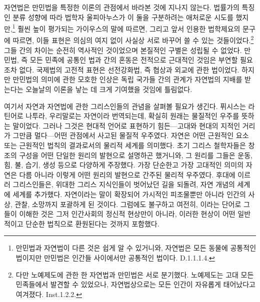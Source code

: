 자연법은 만민법을 특정한 이론의 관점에서 바라본 것에
지나지 않는다.
법률가의 특징인 분류 성향에 따라
법학자 울피아누스가
이 둘을 구분하려는 애처로운 시도를 했지만,\footnote{%
  만민법과 자연법이 다른 것은 쉽게 알 수 있거니와,
  자연법은 모든 동물에 공통적인 법이지만 만민법은 인간들 사이에서만
  공통적인 법이다. D.1.1.1.4.}
훨씬 높이 평가되는 가이우스의 말에 따르면, 그리고
앞서 인용한 법학제요의 문구에 따르면,
이들 표현은 의심의 여지 없이 사실상 서로 바꾸어 쓸 수 있는
것들이었다.\footnote{다만 노예제도에 관한 한 자연법과 만민법은
서로 분기했다. 노예제도는 고대 모든 민족들에서 발견할 수 있었으나,
자연법상으로는 모든 인간이 자유롭게 태어났다고 여겨졌다. Inst.1.2.2.}
그들 간의 차이는 순전히 역사적인 것이었으며
본질적인 구별은 성립될 수 없었다.
만민법, 즉 모든 민족에 공통인 법과
 간의 혼동은 전적으로 근대적인 것임은
부연할 필요조차 없다.
국제법의 고전적 표현은
선전강화법,
즉 협상과 외교에 관한 법이었다.
하지만 만민법의 의미에 관한 모호한 인상은
독립 국가들 간의 관계가 자연법의 지배를 받는다는 오늘날의 이론을
낳는 데 크게 기여했을 것임에 틀림없다.

여기서
자연과 자연법에 관한 그리스인들의 관념을 살펴볼 필요가 생긴다.
퓌시스는 라틴어로 나투라, 우리말로는
자연이라 번역되는데,
확실히 원래는 물질적인 우주를 뜻하는 말이었다.
그러나 그것은 현대적 언어로 표현하기 힘든---고대와 현대의 지적인 거리가
그만큼 멀다---어떤 관점에서 사고된
물질적 우주였다.
자연은 어떤 근원적인 요소 또는 근원적인 법칙의 결과로서의
물리적 세계를 의미했다.
초기 그리스 철학자들은
창조의 구성을 어떤 단일한 원리의 발현으로 설명하곤 했거니와,
그 원리를 그들은 운동, 힘, 불, 습기, 생성 등으로 다양하게 주장했다.
가장 단순한고 가장 고대적인 의미의 자연은 다름 아니라
이렇게 어떤 원리의 발현으로
간주된 물리적 우주였다.
후대에 이르러 그리스인들은, 위대한 그리스 지식인들이 벗어났던 길을 되돌려,
자연 개념의  세계에  세계를 추가했다.
자연이라는 말이 확장되어 가시적인 피조물뿐만 아니라 인간의 사상, 관찰, 소망까지
포괄하게 된 것이다.
그럼에도 불구하고 여전히, 이라는 단어로 그들이 이해한 것은
그저 인간사회의 정신적 현상만이 아니라,
이러한 현상이 어떤 일반적이고 단순한 법칙으로 환원된다는 것까지 포함했다.

